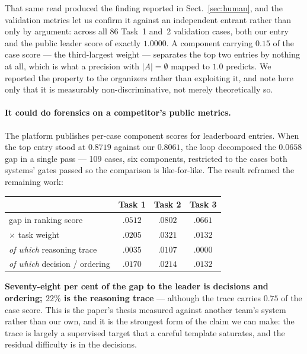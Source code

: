That same read produced the  finding reported in
Sect.~\ref{sec:human}, and the validation
metrics let us confirm it against an independent entrant rather than only by
argument: across all 86 Task~1 and~2 validation cases, both our entry and the
public leader score  of exactly $1.0000$. A component
carrying $0.15$ of the case score --- the third-largest weight --- separates the top
two entries by nothing at all, which is what a precision with $|A| = \emptyset$
mapped to $1.0$ predicts. We reported the property to the organizers rather than
exploiting it, and note here only that it is measurably non-discriminative, not
merely theoretically so.

\paragraph{It could do forensics on a competitor's public metrics.}
The platform publishes per-case component scores for leaderboard entries. When the
top entry stood at $0.8719$ against our $0.8061$, the loop decomposed the $0.0658$
gap in a single pass --- 109 cases, six components, restricted to the cases both
systems' gates passed so the comparison is like-for-like. The result reframed the
remaining work:

\begin{center}
\footnotesize
\begin{tabular}{lccc}
\toprule
& Task 1 & Task 2 & Task 3 \\
\midrule
gap in ranking score        & $.0512$ & $.0802$ & $.0661$ \\
$\times$ task weight        & $.0205$ & $.0321$ & $.0132$ \\
\midrule
\emph{of which} reasoning trace & $.0035$ & $.0107$ & $.0000$ \\
\emph{of which} decision / ordering & $.0170$ & $.0214$ & $.0132$ \\
\bottomrule
\end{tabular}
\end{center}

\noindent
\textbf{Seventy-eight per cent of the gap to the leader is decisions and ordering;
$22\%$ is the reasoning trace} --- although the trace carries $0.75$ of the case
score. This is the paper's thesis measured against another team's system rather than
our own, and it is the strongest form of the claim we can make: the trace is largely
a supervised target that a careful template saturates, and the residual difficulty
is in the decisions.

